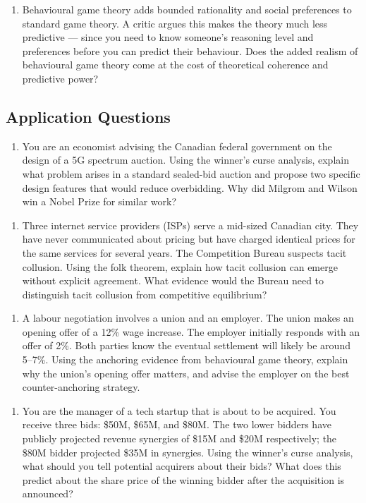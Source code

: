 \documentclass[12pt, letterpaper]{article}
\begin{document}
\begin{enumerate}
\item Behavioural game theory adds bounded rationality and social preferences to standard game theory. A critic argues this makes the theory much less predictive --- since you need to know someone's reasoning level and preferences before you can predict their behaviour. Does the added realism of behavioural game theory come at the cost of theoretical coherence and predictive power?
\end{enumerate}


\subsection{Application Questions}


\begin{enumerate}
\item You are an economist advising the Canadian federal government on the design of a 5G spectrum auction. Using the winner's curse analysis, explain what problem arises in a standard sealed-bid auction and propose two specific design features that would reduce overbidding. Why did Milgrom and Wilson win a Nobel Prize for similar work?
\end{enumerate}

\begin{enumerate}
\item Three internet service providers (ISPs) serve a mid-sized Canadian city. They have never communicated about pricing but have charged identical prices for the same services for several years. The Competition Bureau suspects tacit collusion. Using the folk theorem, explain how tacit collusion can emerge without explicit agreement. What evidence would the Bureau need to distinguish tacit collusion from competitive equilibrium?
\end{enumerate}

\begin{enumerate}
\item A labour negotiation involves a union and an employer. The union makes an opening offer of a 12\% wage increase. The employer initially responds with an offer of 2\%. Both parties know the eventual settlement will likely be around 5--7\%. Using the anchoring evidence from behavioural game theory, explain why the union's opening offer matters, and advise the employer on the best counter-anchoring strategy.
\end{enumerate}

\begin{enumerate}
\item You are the manager of a tech startup that is about to be acquired. You receive three bids: \$50M, \$65M, and \$80M. The two lower bidders have publicly projected revenue synergies of \$15M and \$20M respectively; the \$80M bidder projected \$35M in synergies. Using the winner's curse analysis, what should you tell potential acquirers about their bids? What does this predict about the share price of the winning bidder after the acquisition is announced?
\end{enumerate}
\end{document}
